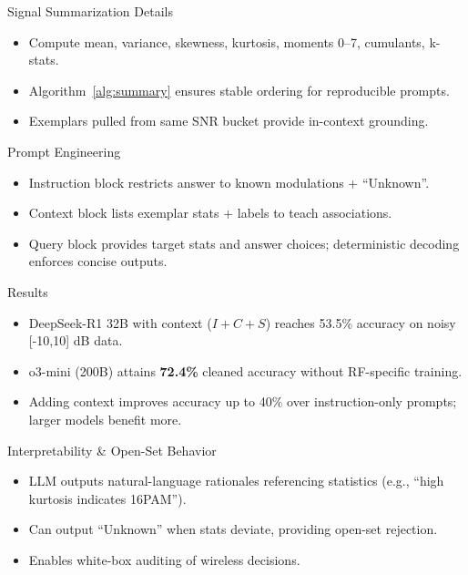 \begin{frame}{Signal Summarization Details}
    \begin{itemize}
        \item Compute mean, variance, skewness, kurtosis, moments 0–7, cumulants, k-stats.
        \item Algorithm~\ref{alg:summary} ensures stable ordering for reproducible prompts.
        \item Exemplars pulled from same SNR bucket provide in-context grounding.
    \end{itemize}
\end{frame}

\begin{frame}{Prompt Engineering}
    \begin{itemize}
        \item Instruction block restricts answer to known modulations + ``Unknown''.
        \item Context block lists exemplar stats + labels to teach associations.
        \item Query block provides target stats and answer choices; deterministic decoding enforces concise outputs.
    \end{itemize}
\end{frame}

\begin{frame}{Results}
    \begin{itemize}
        \item DeepSeek-R1 32B with context ($I+C+S$) reaches 53.5\% accuracy on noisy [-10,10] dB data.
        \item o3-mini (200B) attains \textbf{72.4\%} cleaned accuracy without RF-specific training.
        \item Adding context improves accuracy up to 40\% over instruction-only prompts; larger models benefit more.
    \end{itemize}
\end{frame}

\begin{frame}{Interpretability \& Open-Set Behavior}
    \begin{itemize}
        \item LLM outputs natural-language rationales referencing statistics (e.g., ``high kurtosis indicates 16PAM'').
        \item Can output ``Unknown'' when stats deviate, providing open-set rejection.
        \item Enables white-box auditing of wireless decisions.
    \end{itemize}
\end{frame}

